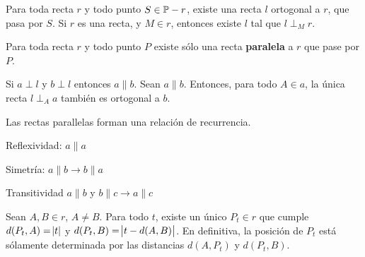 \importante{} Para toda recta $r$ y todo punto $S \in \P - r$, existe una recta $l$ ortogonal a $r$, que pasa por $S$. Si $r$ es una recta, y $M \in r$, entonces existe $l$ tal que $l \perp_M r$.

 Para toda recta $r$ y todo punto $P$ existe sólo una recta \textbf{paralela} a $r$ que pase por $P$.

 Si $a \perp l$ y $b \perp l$ entonces $a \parallel b$. Sean $a \parallel b$. Entonces, para todo $A \in a$, la única recta $l \perp_A a$ también es ortogonal a $b$.

 Las rectas parallelas forman una relación de recurrencia.
\begin{itemizex}
	\item Reflexividad: $a\parallel a$
	\item Simetría: $a \parallel b \rightarrow b \parallel a$
	\item Transitividad  $a \parallel b $ y  $b \parallel c \rightarrow a \parallel c$
\end{itemizex}

 Sean $A,B \in r$, $A \neq B$. Para todo $t$, existe un único $P_t\in r$ que cumple $d(P_t,A) = \abs{t}$ y $d(P_t, B) = \abs{t-d(A,B)}$. En definitiva, la posición de $P_t$ está sólamente determinada por las distancias $d(A, P_t)$ y $d(P_t, B)$.
	 
	 
	 
	 
	 
	 
	 